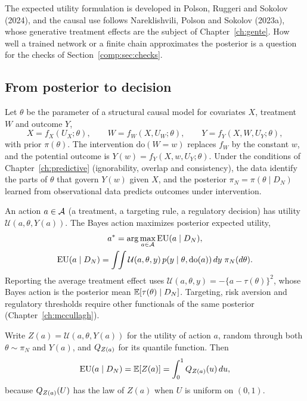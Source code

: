 The expected utility formulation is developed in Polson, Ruggeri and Sokolov (2024), and the causal use follows Nareklishvili, Polson and Sokolov (2023a), whose generative treatment effects are the subject of Chapter~\ref{ch:gente}. How well a trained network or a finite chain approximates the posterior is a question for the checks of Section~\ref{comp:sec:checks}.

\subsection{From posterior to decision}\label{gbc:sec:intro}

Let $\theta$ be the parameter of a structural causal model for covariates $X$, treatment $W$ and outcome $Y$,
\[
X = f_X(U_X;\theta),\qquad W = f_W(X, U_W;\theta),\qquad Y = f_Y(X, W, U_Y;\theta),
\]
with prior $\pi(\theta)$. The intervention $\mathrm{do}(W=w)$ replaces $f_W$ by the constant $w$, and the potential outcome is $Y(w) = f_Y(X, w, U_Y;\theta)$. Under the conditions of Chapter~\ref{ch:predictive} (ignorability, overlap and consistency), the data identify the parts of $\theta$ that govern $Y(w)$ given $X$, and the posterior $\pi_N = \pi(\theta\mid D_N)$ learned from observational data predicts outcomes under intervention.

An action $a\in\mathcal{A}$ (a treatment, a targeting rule, a regulatory decision) has utility $\mathcal{U}(a,\theta,Y(a))$. The Bayes action maximizes posterior expected utility,
\begin{gather}\label{gbc:eq:meu}
a^\ast = \arg\max_{a\in\mathcal{A}} \mathrm{EU}(a\mid D_N),\\
\mathrm{EU}(a\mid D_N) = \int\!\!\int \mathcal{U}(a,\theta,y)\,p(y\mid\theta,\mathrm{do}(a))\,dy\;\pi_N(d\theta).\notag
\end{gather}
Reporting the average treatment effect uses $\mathcal{U}(a,\theta,y)=-\{a-\tau(\theta)\}^2$, whose Bayes action is the posterior mean $\mathbb{E}[\tau(\theta)\mid D_N]$. Targeting, risk aversion and regulatory thresholds require other functionals of the same posterior (Chapter~\ref{ch:mccullagh}).

Write $Z(a) = \mathcal{U}(a,\theta,Y(a))$ for the utility of action $a$, random through both $\theta\sim\pi_N$ and $Y(a)$, and $Q_{Z(a)}$ for its quantile function. Then
\begin{equation}\label{gbc:eq:quantileidentity}
\mathrm{EU}(a\mid D_N) = \mathbb{E}[Z(a)] = \int_0^1 Q_{Z(a)}(u)\,du ,
\end{equation}
because $Q_{Z(a)}(U)$ has the law of $Z(a)$ when $U$ is uniform on $(0,1)$. 

